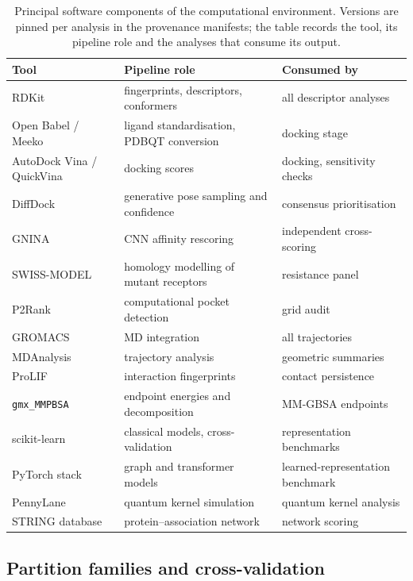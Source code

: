 \begin{table}[htbp]
	\centering
	\caption[Principal software components]{Principal software components of the computational environment. Versions are pinned per analysis in the provenance manifests; the table records the tool, its pipeline role and the analyses that consume its output.}
	\label{tab:met_software}
	\small
	\begin{tabular}{@{}l l l@{}}
		\toprule
		Tool & Pipeline role & Consumed by \\
		\midrule
		RDKit & fingerprints, descriptors, conformers & all descriptor analyses \\
		Open Babel / Meeko & ligand standardisation, PDBQT conversion & docking stage \\
		AutoDock Vina / QuickVina & docking scores & docking, sensitivity checks \\
		DiffDock & generative pose sampling and confidence & consensus prioritisation \\
		GNINA & CNN affinity rescoring & independent cross-scoring \\
		SWISS-MODEL & homology modelling of mutant receptors & resistance panel \\
		P2Rank & computational pocket detection & grid audit \\
		GROMACS & MD integration & all trajectories \\
		MDAnalysis & trajectory analysis & geometric summaries \\
		ProLIF & interaction fingerprints & contact persistence \\
		\texttt{gmx\_MMPBSA} & endpoint energies and decomposition & MM-GBSA endpoints \\
		scikit-learn & classical models, cross-validation & representation benchmarks \\
		PyTorch stack & graph and transformer models & learned-representation benchmark \\
		PennyLane & quantum kernel simulation & quantum kernel analysis \\
		STRING database & protein--association network & network scoring \\
		\bottomrule
	\end{tabular}
\end{table}

\subsection{Partition families and cross-validation}

